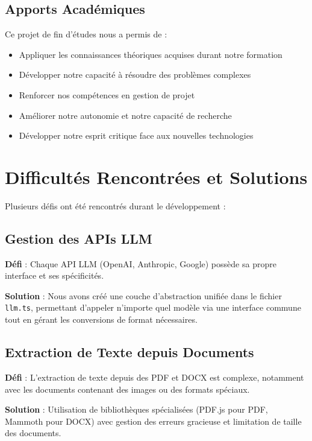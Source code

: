 \subsection*{Apports Académiques}

Ce projet de fin d'études nous a permis de :

\begin{itemize}
    \item Appliquer les connaissances théoriques acquises durant notre formation
    \item Développer notre capacité à résoudre des problèmes complexes
    \item Renforcer nos compétences en gestion de projet
    \item Améliorer notre autonomie et notre capacité de recherche
    \item Développer notre esprit critique face aux nouvelles technologies
\end{itemize}

\section*{Difficultés Rencontrées et Solutions}

Plusieurs défis ont été rencontrés durant le développement :

\subsection*{Gestion des APIs LLM}

\textbf{Défi} : Chaque API LLM (OpenAI, Anthropic, Google) possède sa propre interface et ses spécificités.

\textbf{Solution} : Nous avons créé une couche d'abstraction unifiée dans le fichier \texttt{llm.ts}, permettant d'appeler n'importe quel modèle via une interface commune tout en gérant les conversions de format nécessaires.

\subsection*{Extraction de Texte depuis Documents}

\textbf{Défi} : L'extraction de texte depuis des PDF et DOCX est complexe, notamment avec les documents contenant des images ou des formats spéciaux.

\textbf{Solution} : Utilisation de bibliothèques spécialisées (PDF.js pour PDF, Mammoth pour DOCX) avec gestion des erreurs gracieuse et limitation de taille des documents.

